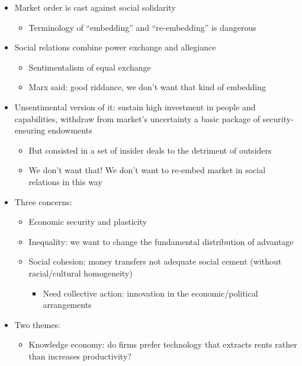 \begin{itemize}
\tightlist
\item
  Market order is cast against social solidarity

  \begin{itemize}
  \tightlist
  \item
    Terminology of ``embedding'' and ``re-embedding'' is dangerous
  \end{itemize}
\item
  Social relations combine power exchange and allegiance

  \begin{itemize}
  \tightlist
  \item
    Sentimentalism of equal exchange
  \item
    Marx said: good riddance, we don't want that kind of embedding
  \end{itemize}
\item
  Unsentimental version of it: sustain high investment in people and
  capabilities, withdraw from market's uncertainty a basic package of
  security-ensuring endowments

  \begin{itemize}
  \tightlist
  \item
    But consisted in a set of insider deals to the detriment of
    outsiders
  \item
    We don't want that! We don't want to re-embed market in social
    relations in this way
  \end{itemize}
\item
  Three concerns:

  \begin{itemize}
  \tightlist
  \item
    Economic security and plasticity
  \item
    Inequality: we want to change the fundamental distribution of
    advantage
  \item
    Social cohesion: money transfers not adequate social cement (without
    racial/cultural homogeneity)

    \begin{itemize}
    \tightlist
    \item
      Need collective action: innovation in the economic/political
      arrangements
    \end{itemize}
  \end{itemize}
\item
  Two themes:

  \begin{itemize}
  \tightlist
  \item
    Knowledge economy: do firms prefer technology that extracts rents
    rather than increases productivity?


\end{itemize}
\end{itemize}
